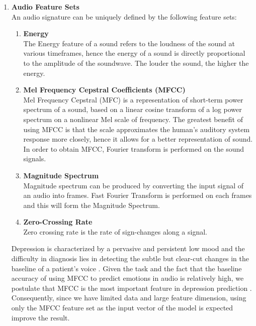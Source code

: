 \documentclass{article}
\begin{document}
	\begin{enumerate}
		\item \textbf{Audio Feature Sets}	\\
		An audio signature can be uniquely defined by the following feature sets:
		\begin{enumerate}
			\item \textbf{Energy}	\\
			The Energy feature of a sound refers to the loudness of the sound at various timeframes, 
			hence the energy of a sound is directly proportional to the amplitude of the soundwave. 
			The louder the sound, the higher the energy.
		
			\item \textbf{Mel Frequency Cepstral Coefficients (MFCC)} \\
			Mel Frequency Cepstral (MFC) is a representation of short-term power spectrum of a sound, 
			based on a linear cosine transform of a log power spectrum on a nonlinear Mel scale of frequency. 
			The greatest benefit of using MFCC is that the scale approximates the 
			human's auditory system response more closely, hence it allows for a better representation of sound. 
			In order to obtain MFCC, Fourier transform is performed on the sound signals.	
		
			\item \textbf{Magnitude Spectrum} \\
			Magnitude spectrum can be produced by converting the input signal of an audio into frames. 
			Fast Fourier Transform is performed on each frames and this will form the Magnitude Spectrum.
			
			\item \textbf{Zero-Crossing Rate} \\
			Zero crossing rate is the rate of sign-changes along a signal.
		\end{enumerate}
	
	Depression is characterized by a pervasive and persistent low mood and the difficulty in diagnosis 
	lies in detecting the subtle but clear-cut changes in the baseline of a patient's voice \cite{Stratou2015}.
	Given the task and the fact that the baseline accuracy of using MFCC to predict emotions in audio is relatively high, 
	we postulate that MFCC is the most important feature in depression prediction \cite{ElAyadi2011}. 
	Consequently, since we have limited data and large feature dimension, 
	using only the MFCC feature set as the input vector of the model is expected improve the result.
		

\end{enumerate}
\end{document}
